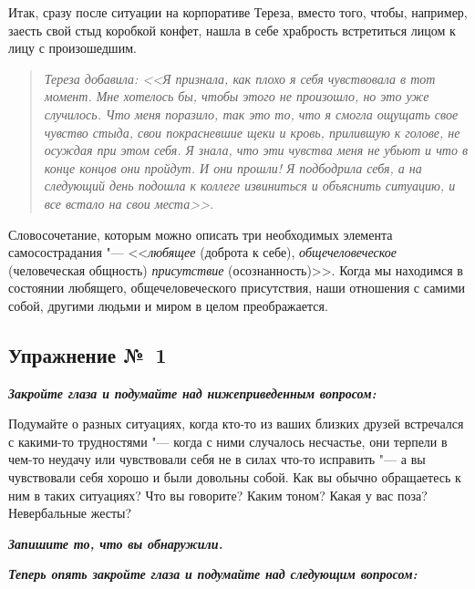 Итак, сразу после ситуации на корпоративе Тереза, вместо того, чтобы, например, заесть свой стыд коробкой конфет, нашла в себе храбрость встретиться лицом к лицу с произошедшим.

\begin{quote} 
\textit{Тереза добавила: <<Я признала, как плохо я себя чувствовала в тот момент. Мне хотелось бы,  чтобы этого не произошло, но это уже случилось. Что меня поразило, так это то, что я смогла ощущать свое чувство стыда, свои покрасневшие щеки и кровь, прилившую к голове, не осуждая при этом себя. Я знала, что эти чувства меня не убьют и что в конце концов они пройдут. И они прошли! Я подбодрила себя, а на следующий день подошла к коллеге извиниться и объяснить ситуацию, и все встало на свои места>>.}
\end{quote}

Словосочетание, которым можно описать три необходимых элемента самосострадания "--- <<\emph{любящее} (доброта к себе), \emph{общечеловеческое} (человеческая общность) \emph{присутствие} (осознанность)>>. Когда мы находимся в состоянии любящего, общечеловеческого присутствия, наши отношения с самими собой, другими людьми и миром в целом преображается.


\newpage


\subsection{Упражнение №~1}


\vspace{3ex}

\textbf{\textit{Закройте глаза и подумайте над нижеприведенным вопросом: }}

Подумайте о разных ситуациях, когда кто-то из ваших близких друзей встречался с какими-то трудностями "--- когда с ними случалось несчастье, они терпели в чем-то неудачу или чувствовали себя не в силах что-то исправить "--- а вы чувствовали себя хорошо и были довольны собой. Как вы обычно обращаетесь к ним в таких ситуациях? 
Что вы говорите? Каким тоном? Какая у вас поза? Невербальные жесты? 

\vspace{2ex}

\textbf{\textit{Запишите то, что вы обнаружили.}}


\newpage


\textbf{\textit{Теперь опять закройте глаза и подумайте над следующим вопросом:}}

